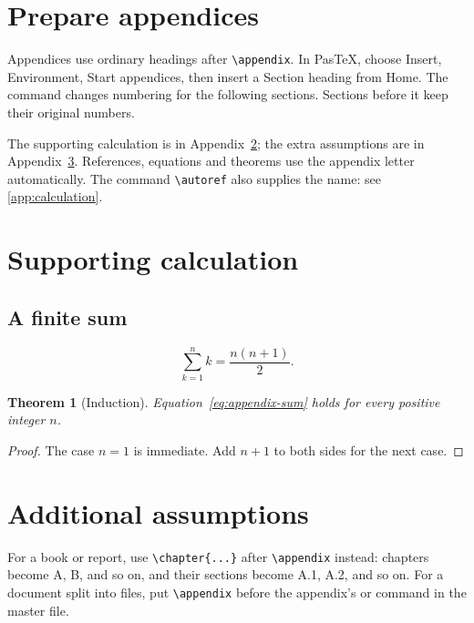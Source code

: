 \documentclass[12pt]{article}
\newtheorem{theorem}{Theorem}[section]
\theoremstyle{definition}
\theoremstyle{remark}
\numberwithin{equation}{section}
\begin{document}
\section{Prepare appendices}
Appendices use ordinary headings after \verb|\appendix|. In PasTeX, choose
Insert, Environment, Start appendices, then insert a Section heading from Home.
The command changes numbering for the following sections. Sections before it keep their original numbers.

The supporting calculation is in Appendix~\ref{app:calculation}; the extra
assumptions are in Appendix~\ref{app:assumptions}. References, equations and
theorems use the appendix letter automatically.
The command \verb|\autoref| also supplies the name: see \autoref{app:calculation}.

\appendix
\section{Supporting calculation}\label{app:calculation}
\subsection{A finite sum}\label{app:sum}
\begin{equation}\label{eq:appendix-sum}
  \sum_{k=1}^{n} k = \frac{n(n+1)}{2}.
\end{equation}
\begin{theorem}[Induction]
Equation~\eqref{eq:appendix-sum} holds for every positive integer $n$.
\end{theorem}
\begin{proof}
The case $n=1$ is immediate. Add $n+1$ to both sides for the next case.
\end{proof}

\section{Additional assumptions}\label{app:assumptions}
For a book or report, use \verb|\chapter{...}| after \verb|\appendix| instead:
chapters become A, B, and so on, and their sections become A.1, A.2, and so on.
For a document split into files, put \verb|\appendix| before the appendix's
\verb|| or \verb|| command in the master file.
\end{document}
